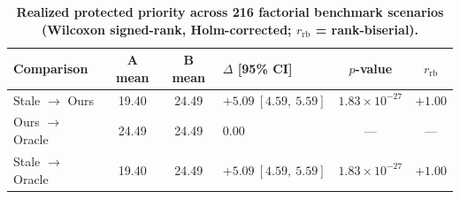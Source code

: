 \documentclass{ieeeaccess}
\begin{document}
\begin{table}[p]
\caption{\textbf{Realized protected priority across 216 factorial benchmark scenarios (Wilcoxon signed-rank, Holm-corrected; $r_{\text{rb}}$ = rank-biserial).}}
\label{tab:expA}
\centering
\renewcommand{\arraystretch}{1.2}
\begin{tabularx}{\textwidth}{|l|c|c|X|c|c|}
\hline
\textbf{Comparison} & \textbf{A mean} & \textbf{B mean} & \textbf{$\Delta$ [95\% CI]} & \textbf{$p$-value} & \textbf{$r_{\text{rb}}$} \\
\hline
Stale $\to$ Ours   & 19.40 & 24.49 & $+5.09\ [4.59,\ 5.59]$ & $1.83\times10^{-27}$ & $+1.00$ \\
\hline
Ours $\to$ Oracle  & 24.49 & 24.49 & $0.00$                  & ---                  & ---     \\
\hline
Stale $\to$ Oracle & 19.40 & 24.49 & $+5.09\ [4.59,\ 5.59]$ & $1.83\times10^{-27}$ & $+1.00$ \\
\hline
\end{tabularx}
\end{table}

\EOD
\end{document}

